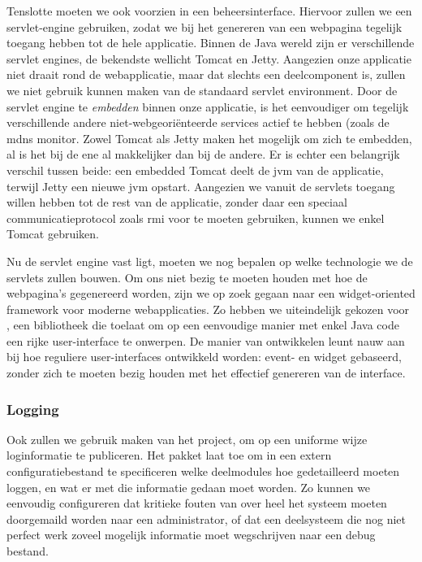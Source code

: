 Tenslotte moeten we ook voorzien in een beheersinterface. Hiervoor zullen we een servlet-engine gebruiken, zodat we bij het genereren van een webpagina tegelijk toegang hebben tot de hele applicatie. Binnen de Java wereld zijn er verschillende servlet engines, de bekendste wellicht Tomcat en Jetty. Aangezien onze applicatie niet draait rond de webapplicatie, maar dat slechts een deelcomponent is, zullen we niet gebruik kunnen maken van de standaard servlet environment. Door de servlet engine te \emph{embedden} binnen onze applicatie, is het eenvoudiger om tegelijk verschillende andere niet-webgeoriënteerde services actief te hebben (zoals de \ac{mdns} monitor. Zowel Tomcat als Jetty maken het mogelijk om zich te embedden, al is het bij de ene al makkelijker dan bij de andere. Er is echter een belangrijk verschil tussen beide: een embedded Tomcat deelt de \ac{jvm} van de applicatie, terwijl Jetty een nieuwe \ac{jvm} opstart. Aangezien we vanuit de servlets toegang willen hebben tot de rest van de applicatie, zonder daar een speciaal communicatieprotocol zoals \ac{rmi} voor te moeten gebruiken, kunnen we enkel Tomcat gebruiken.

Nu de servlet engine vast ligt, moeten we nog bepalen op welke technologie we de servlets zullen bouwen. Om ons niet bezig te moeten houden met hoe de webpagina's gegenereerd worden, zijn we op zoek gegaan naar een widget-oriented framework voor moderne webapplicaties. Zo hebben we uiteindelijk gekozen voor , een bibliotheek die toelaat om op een eenvoudige manier met enkel Java code een rijke user-interface te onwerpen. De manier van ontwikkelen leunt nauw aan bij hoe reguliere user-interfaces ontwikkeld worden: event- en widget gebaseerd, zonder zich te moeten bezig houden met het effectief genereren van de interface.

\subsubsection{Logging}

Ook zullen we gebruik maken van het  project, om op een uniforme wijze loginformatie te publiceren. Het pakket laat toe om in een extern configuratiebestand te specificeren welke deelmodules hoe gedetailleerd moeten loggen, en wat er met die informatie gedaan moet worden. Zo kunnen we eenvoudig configureren dat kritieke fouten van over heel het systeem moeten doorgemaild worden naar een administrator, of dat een deelsysteem die nog niet perfect werk zoveel mogelijk informatie moet wegschrijven naar een debug bestand.

